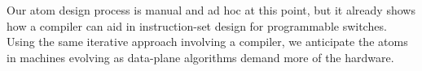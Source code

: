 Our atom design process is manual and ad hoc at this point, but it already
shows how  a compiler can aid in instruction-set design for programmable
switches. Using the same iterative approach involving a compiler, we anticipate
the atoms in \absmachine machines evolving as data-plane algorithms demand more
of the hardware.

